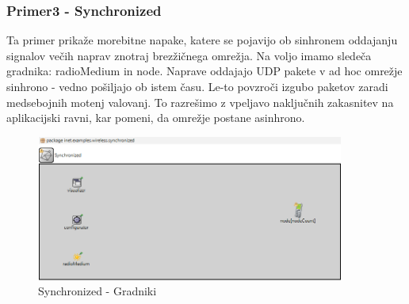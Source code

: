 \documentclass[11pt,a4paper,slovene]{myarticle}
\begin{document}
\subsubsection{Primer3 - Synchronized}
Ta primer prikaže morebitne napake, katere se pojavijo ob sinhronem oddajanju signalov večih naprav znotraj brezžičnega omrežja. Na voljo imamo sledeča gradnika: radioMedium in node. Naprave oddajajo UDP pakete v ad hoc omrežje sinhrono - vedno pošiljajo ob istem času. Le-to povzroči izgubo paketov zaradi medsebojnih motenj valovanj. To razrešimo z vpeljavo naključnih zakasnitev na aplikacijski ravni, kar pomeni, da omrežje postane asinhrono.
\begin{figure}[h]
	\centering
		\includegraphics[width=0.9\textwidth, keepaspectratio=true]{./images/syn-components.png}
	\caption{Synchronized - Gradniki}
	\label{fig:synchronizedgradniki}
\end{figure}
\end{document}
